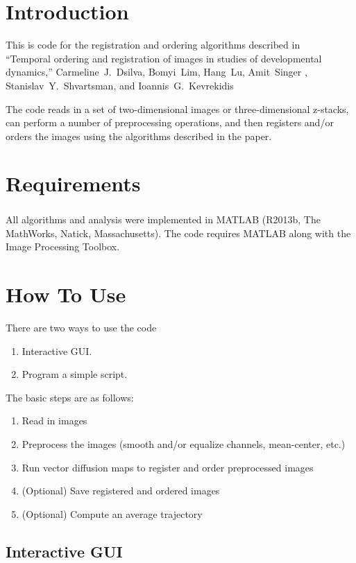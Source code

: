 \documentclass[12pt]{article}
\begin{document}
\section{Introduction}

This is code for the registration and ordering algorithms described in \\
``Temporal ordering and registration of images in studies of developmental dynamics,'' Carmeline~J.~Dsilva, Bomyi~Lim, Hang~Lu, Amit~Singer , Stanislav~Y.~Shvartsman, and Ioannis~G.~Kevrekidis

The code reads in a set of two-dimensional images or three-dimensional z-stacks, can perform a number of preprocessing operations, and then registers and/or orders the images using the algorithms described in the paper. 

\section{Requirements}

All algorithms and analysis were implemented in MATLAB\textsuperscript{\textregistered} (R2013b, The MathWorks, Natick, Massachusetts).
%
The code requires MATLAB along with the Image Processing Toolbox. 

\section{How To Use}

There are two ways to use the code
\begin{enumerate}
\item Interactive GUI.
\item Program a simple script.
\end{enumerate}

The basic steps are as follows:
\begin{enumerate}
   \item Read in images
   \item Preprocess the images (smooth and/or equalize channels, mean-center, etc.)
   \item Run vector diffusion maps to register and order preprocessed images
   \item (Optional) Save registered and ordered images
   \item (Optional) Compute an average trajectory
\end{enumerate}

\subsection{Interactive GUI}
\end{document}
